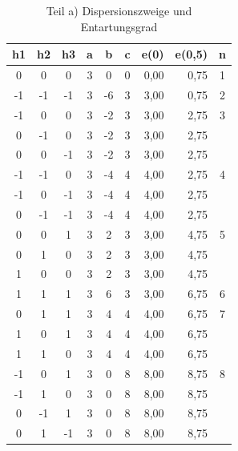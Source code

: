 \begin{table}[!ht]
\caption{Teil a) Dispersionszweige und Entartungsgrad}
\begin{center}
\begin{tabular}{|c|c|c|c|c|c|r|r|c|}
\hline
\textbf{h1} & \textbf{h2} & \textbf{h3} & \textbf{a} & \textbf{b} & \textbf{c}
& \multicolumn{1}{c|}{\textbf{e(0)}} & \multicolumn{1}{c|}{\textbf{e(0,5)}} & \textbf{n} \\ \hline
0 & 0 & 0 & 3 & 0 & 0 & 0,00 & 0,75 & 1 \\ \hline
-1 & -1 & -1 & 3 & -6 & 3 & 3,00 & 0,75 & 2 \\ \hline
-1 & 0 & 0 & 3 & -2 & 3 & 3,00 & 2,75 & \multicolumn{ 1}{c|}{3} \\ \cline{ 1- 8}
0 & -1 & 0 & 3 & -2 & 3 & 3,00 & 2,75 & \multicolumn{ 1}{c|}{} \\ \cline{ 1- 8}
0 & 0 & -1 & 3 & -2 & 3 & 3,00 & 2,75 & \multicolumn{ 1}{c|}{} \\ \hline
-1 & -1 & 0 & 3 & -4 & 4 & 4,00 & 2,75 & \multicolumn{ 1}{c|}{4} \\ \cline{ 1- 8}
-1 & 0 & -1 & 3 & -4 & 4 & 4,00 & 2,75 & \multicolumn{ 1}{c|}{} \\ \cline{ 1- 8}
0 & -1 & -1 & 3 & -4 & 4 & 4,00 & 2,75 & \multicolumn{ 1}{c|}{} \\ \hline
0 & 0 & 1 & 3 & 2 & 3 & 3,00 & 4,75 & \multicolumn{ 1}{c|}{5} \\ \cline{ 1- 8}
0 & 1 & 0 & 3 & 2 & 3 & 3,00 & 4,75 & \multicolumn{ 1}{c|}{} \\ \cline{ 1- 8}
1 & 0 & 0 & 3 & 2 & 3 & 3,00 & 4,75 & \multicolumn{ 1}{c|}{} \\ \hline
1 & 1 & 1 & 3 & 6 & 3 & 3,00 & 6,75 & 6 \\ \hline
0 & 1 & 1 & 3 & 4 & 4 & 4,00 & 6,75 & \multicolumn{ 1}{c|}{7} \\ \cline{ 1- 8}
1 & 0 & 1 & 3 & 4 & 4 & 4,00 & 6,75 & \multicolumn{ 1}{c|}{} \\ \cline{ 1- 8}
1 & 1 & 0 & 3 & 4 & 4 & 4,00 & 6,75 & \multicolumn{ 1}{c|}{} \\ \hline
-1 & 0 & 1 & 3 & 0 & 8 & 8,00 & 8,75 & \multicolumn{ 1}{c|}{8} \\ \cline{ 1- 8}
-1 & 1 & 0 & 3 & 0 & 8 & 8,00 & 8,75 & \multicolumn{ 1}{c|}{} \\ \cline{ 1- 8}
0 & -1 & 1 & 3 & 0 & 8 & 8,00 & 8,75 & \multicolumn{ 1}{c|}{} \\ \cline{ 1- 8}
0 & 1 & -1 & 3 & 0 & 8 & 8,00 & 8,75 & \multicolumn{ 1}{c|}{} \\ \cline{ 1- 8}

\end{tabular}
\end{center}
\end{table}
